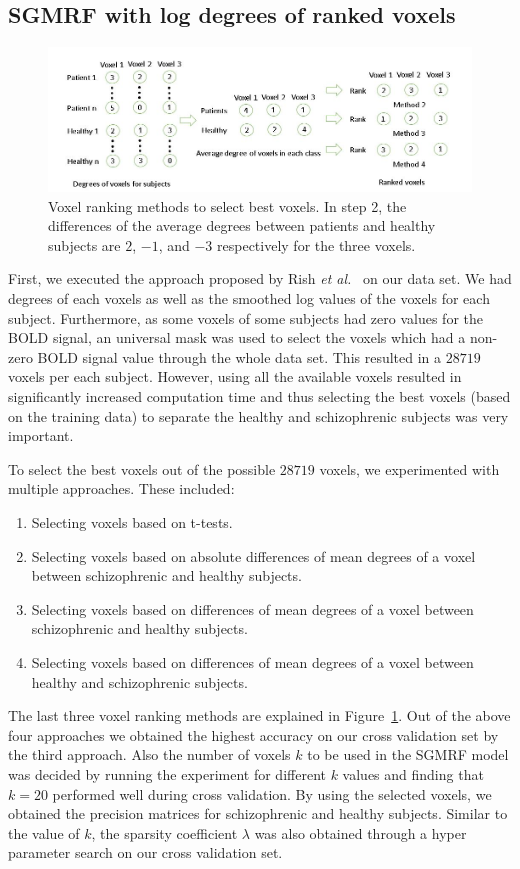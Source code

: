 \documentclass{article} %
\begin{document}
\subsection{SGMRF with log degrees of ranked voxels}
\begin{figure}\label{fig:voxel_rank}
\includegraphics[width=\textwidth]{diagrams/Voxel_ranking.jpg}
\caption{Voxel ranking methods to select best voxels. In step 2, the differences of the average degrees between patients and healthy subjects are $2$, $-1$, and $-3$ respectively for the three voxels.}
\end{figure}
First, we executed the approach proposed by Rish \emph{et al.}~\cite{Rish_2013} 
on our data set. We had degrees of each voxels as well 
as the smoothed log values of the voxels for each subject. Furthermore, as 
some voxels of some subjects had zero values for the BOLD signal, an universal 
mask was used to select the voxels which had a non-zero BOLD signal value 
through the whole data set. This resulted in a $28719$ voxels per each subject. 
However, using all the available voxels resulted in significantly increased 
computation time
and thus selecting the best voxels (based on the training data) to separate 
the healthy and schizophrenic subjects was very important. 

To select the best voxels out of the possible $28719$ voxels, we experimented
with multiple approaches. 
These included: \begin{enumerate}
  \item Selecting voxels based on t-tests.
  \item Selecting voxels based on absolute differences of mean degrees of a voxel between schizophrenic and healthy subjects.
  \item Selecting voxels based on differences of mean degrees of a voxel between schizophrenic and healthy subjects.
  \item Selecting voxels based on differences of mean degrees of a voxel between healthy and schizophrenic subjects.
\end{enumerate}
The last three voxel ranking methods are explained in Figure~\ref{fig:voxel_rank}. 
Out of the above four approaches we obtained the highest accuracy on our cross 
validation set by the third approach. Also the number of voxels $k$ to be used 
in the SGMRF model was decided by running the experiment for different $k$ 
values and finding that $k = 20$ performed well during cross validation. By using the selected voxels, we obtained the precision matrices for schizophrenic and healthy subjects. Similar to the value of $k$, the sparsity coefficient 
$\lambda$ was also obtained through a hyper parameter search on our cross 
validation set.
\end{document}
